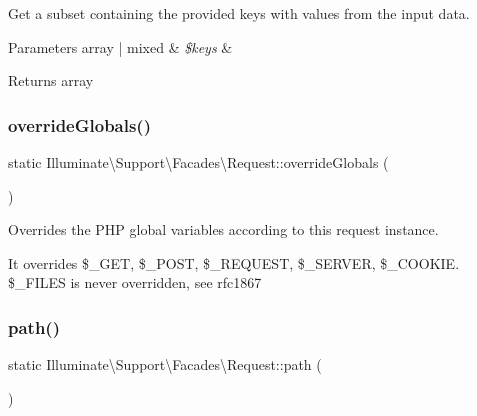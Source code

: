 Get a subset containing the provided keys with values from the input data.


\begin{DoxyParams}[1]{Parameters}
array | mixed & {\em \$keys} & \\
\hline
\end{DoxyParams}
\begin{DoxyReturn}{Returns}
array 
\end{DoxyReturn}
\mbox{\label{class_illuminate_1_1_support_1_1_facades_1_1_request_afd2c5e18dcee250f7de186821bf7afab}} 
\subsubsection{\texorpdfstring{override\+Globals()}{overrideGlobals()}}
{\footnotesize\ttfamily static Illuminate\textbackslash{}\+Support\textbackslash{}\+Facades\textbackslash{}\+Request\+::override\+Globals (\begin{DoxyParamCaption}{ }\end{DoxyParamCaption})\hspace{0.3cm}{\ttfamily [static]}}

Overrides the P\+HP global variables according to this request instance.

It overrides \$\+\_\+\+G\+ET, \$\+\_\+\+P\+O\+ST, \$\+\_\+\+R\+E\+Q\+U\+E\+ST, \$\+\_\+\+S\+E\+R\+V\+ER, \$\+\_\+\+C\+O\+O\+K\+IE. \$\+\_\+\+F\+I\+L\+ES is never overridden, see rfc1867 \mbox{\label{class_illuminate_1_1_support_1_1_facades_1_1_request_ad288b957470d9cdb3b2b35c65c6e7a4c}} 
\subsubsection{\texorpdfstring{path()}{path()}}
{\footnotesize\ttfamily static Illuminate\textbackslash{}\+Support\textbackslash{}\+Facades\textbackslash{}\+Request\+::path (\begin{DoxyParamCaption}{ }\end{DoxyParamCaption})\hspace{0.3cm}{\ttfamily [static]}}

